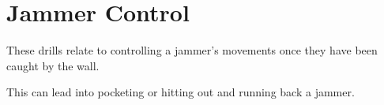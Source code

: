 \section*{Jammer Control}
These drills relate to controlling a jammer's movements once they have been caught by the wall. 

This can lead into pocketing or hitting out and running back a jammer. 
